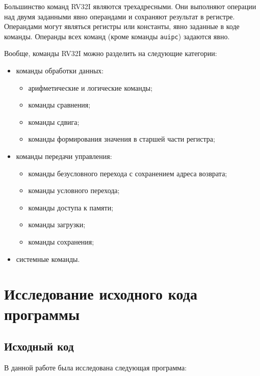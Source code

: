 \documentclass[oneside, a4paper, 12pt]{report}
\begin{document}
Большинство команд RV32I являются трехадресными. Они выполняют
операции над двумя заданными явно операндами и сохраняют результат
в регистре. Операндами могут являться регистры или константы, явно
заданные в коде команды. Операнды всех команд (кроме команды
\texttt{auipc}) задаются явно.

Вообще, команды RV32I можно разделить на следующие категории:

\begin{itemize}

    \item команды обработки данных:
    
    \begin{itemize}
        \item арифметические и логические команды;
        \item команды сравнения;
        \item команды сдвига;
        \item команды формирования значения в старшей части
        регистра;
    \end{itemize}

    \item команды передачи управления:

    \begin{itemize}
        \item команды безусловного перехода с сохранением адреса
        возврата;
        \item команды условного перехода;
        \item команды доступа к памяти;
        \item команды загрузки;
        \item команды сохранения;
    \end{itemize}

    \item системные команды.

\end{itemize}

\chapter{Исследование исходного кода программы}

\section{Исходный код}

В данной работе была исследована следующая программа:
\end{document}

